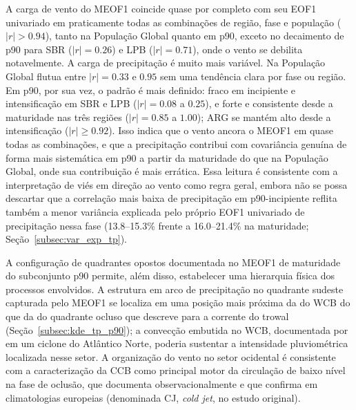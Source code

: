 A carga de vento do MEOF1 coincide quase por completo com seu EOF1 univariado em praticamente todas as combinações de região, fase e população ($|r|>0.94$), tanto na População Global quanto em p90, exceto no decaimento de p90 para SBR ($|r|=0.26$) e LPB ($|r|=0.71$), onde o vento se debilita notavelmente. A carga de precipitação é muito mais variável. Na População Global flutua entre $|r|=0.33$ e $0.95$ sem uma tendência clara por fase ou região. Em p90, por sua vez, o padrão é mais definido: fraco em incipiente e intensificação em SBR e LPB ($|r|=0.08$ a $0.25$), e forte e consistente desde a maturidade nas três regiões ($|r|=0.85$ a $1.00$); ARG se mantém alto desde a intensificação ($|r|\geq0.92$). Isso indica que o vento ancora o MEOF1 em quase todas as combinações, e que a precipitação contribui com covariância genuína de forma mais sistemática em p90 a partir da maturidade do que na População Global, onde sua contribuição é mais errática. Essa leitura é consistente com a interpretação de viés em direção ao vento como regra geral, embora não se possa descartar que a correlação mais baixa de precipitação em p90-incipiente reflita também a menor variância explicada pelo próprio EOF1 univariado de precipitação nessa fase (13.8--15.3\% frente a 16.0--21.4\% na maturidade; Seção~\ref{subsec:var_exp_tp}).

A configuração de quadrantes opostos documentada no MEOF1 de maturidade do subconjunto p90 permite, além disso, estabelecer uma hierarquia física dos processos envolvidos.
A estrutura em arco de precipitação no quadrante sudeste capturada pelo MEOF1 se localiza em uma posição mais próxima da do WCB do que da do quadrante ocluso que \citet{martin1999forcing} descreve para a corrente do trowal (Seção~\ref{subsec:kde_tp_p90}); a convecção embutida no WCB, documentada por \citet{oertel2021warm} em um ciclone do Atlântico Norte, poderia sustentar a intensidade pluviométrica localizada nesse setor.
A organização do vento no setor ocidental é consistente com a caracterização da CCB como principal motor da circulação de baixo nível na fase de oclusão, que \citet{martinez2014cold} documenta observacionalmente e que \citet{eisenstein2023identification} confirma em climatologias europeias (denominada CJ, \textit{cold jet}, no estudo original).

